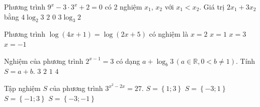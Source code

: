 \begin{ex}%
	Phương trình $9^x-3\cdot 3^x+2=0$ có 2 nghiệm $x_1$,  $x_2$ với $x_1 < x_2$. Giá trị $2x_1+3x_2$ bằng
	\choice 
		{$4\log_2  3$}
		{$2$} 
		{$0$} 
		 {\True $3\log_3 2$}
\end{ex}

\begin{ex}%
	Phương trình $\log (4x+1)=\log (2x+5)$  có nghiệm là
	\choice 
		{\True  $x=2$}
		 {$x=1$}
		 {$x=3$}
		{$x=-1$} 
\end{ex}

\begin{ex}%
	Nghiệm của  phương trình $2^{x-1}=3$ có dạng $a+\log _{b}3\,(a\in \mathbb{R},0<b\neq 1)$. Tính $S=a+b$.
	\choice 
		 {\True $3$}
		 {$2$}
		{$1$} 
		{$4$} 
\end{ex}

\begin{ex}%
	Tập nghiệm $S$ của phương trình $3^{x^2-2x}=27$. 
	 \choice
		{$S=\left\{1; 3\right\}$} 
		{$S=\left\{-3; 1\right\}$} 
		{\True $S=\left\{-1;  3\right\}$}
		 {$S=\left\{-3;-1\right\}$}
\end{ex}

